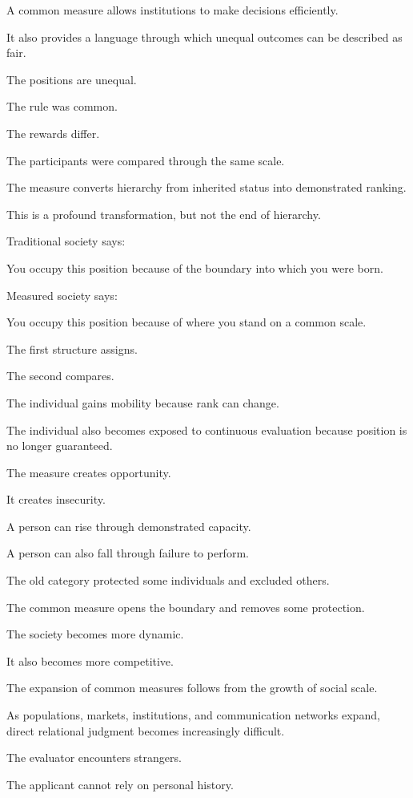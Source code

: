 A common measure allows institutions to make decisions efficiently.

It also provides a language through which unequal outcomes can be described as fair.

The positions are unequal.

The rule was common.

The rewards differ.

The participants were compared through the same scale.

The measure converts hierarchy from inherited status into demonstrated ranking.

This is a profound transformation, but not the end of hierarchy.

Traditional society says:

You occupy this position because of the boundary into which you were born.

Measured society says:

You occupy this position because of where you stand on a common scale.

The first structure assigns.

The second compares.

The individual gains mobility because rank can change.

The individual also becomes exposed to continuous evaluation because position is no longer guaranteed.

The measure creates opportunity.

It creates insecurity.

A person can rise through demonstrated capacity.

A person can also fall through failure to perform.

The old category protected some individuals and excluded others.

The common measure opens the boundary and removes some protection.

The society becomes more dynamic.

It also becomes more competitive.

The expansion of common measures follows from the growth of social scale.

As populations, markets, institutions, and communication networks expand, direct relational judgment becomes increasingly difficult.

The evaluator encounters strangers.

The applicant cannot rely on personal history.


